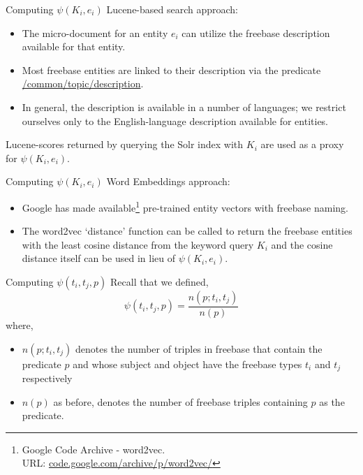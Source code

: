 \documentclass[pdf,11pt]{beamer}
\begin{document}
\begin{frame}{Computing $\psi(K_i, e_i)$}
Lucene-based search approach:

\begin{itemize}
\item The micro-document for an entity $e_i$ can utilize the freebase description available for that entity. 
\item Most freebase entities are linked to their description via the predicate \url{/common/topic/description}. 
\item In general, the description is available in a number of languages; we restrict ourselves only to the English-language description available for entities.
\end{itemize}

Lucene-scores returned by querying the Solr index with $K_i$ are used as a proxy for $\psi(K_i, e_i)$.
\end{frame}

\begin{frame}{Computing $\psi(K_i, e_i)$}
Word Embeddings approach:

\begin{itemize}
\item Google has made available\footnote{Google Code Archive - word2vec. \\ URL: \url{code.google.com/archive/p/word2vec/}} pre-trained entity vectors with freebase naming. 
\item The word2vec `distance' function can be called to return the freebase entities with the least cosine distance from the keyword query $K_i$ and the cosine distance itself can be used in lieu of $\psi(K_i,e_i)$. 
\end{itemize}
\end{frame}

\begin{frame}{Computing $\psi(t_i, t_j, p)$}
Recall that we defined, $$\psi(t_i, t_j, p) = \frac{n(p;t_i,t_j)}{n(p)}$$ 
where,
\begin{itemize} 
\item $n(p;t_i,t_j)$ denotes the number of triples in freebase that contain the predicate $p$ and whose subject and object have the freebase types $t_i$ and $t_j$ respectively 
\item $n(p)$ as before, denotes the number of freebase triples containing $p$ as the predicate.
\end{itemize}

\end{frame}
\end{document}
